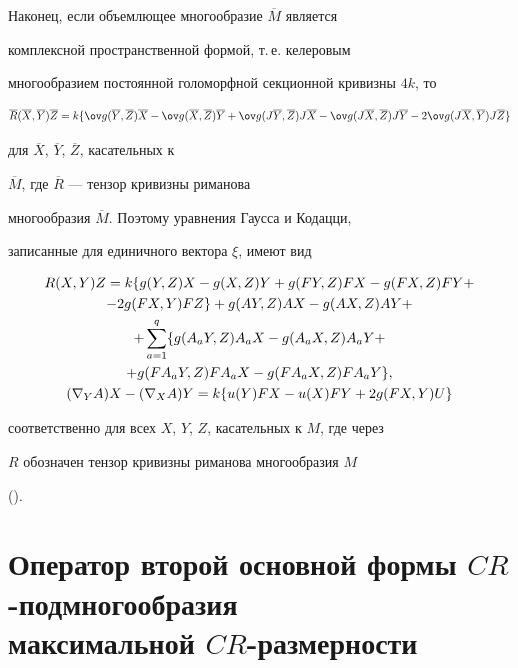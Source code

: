 Наконец, если объемлющее многообразие $\overline M$ является


комплексной пространственной формой, т.\,е. келеровым


многообразием постоянной голоморфной секционной кривизны $4k$, то


$$


\overline R(\overline X,\overline Y)\overline Z=


k\{\ov g(\overline Y,\overline Z)\overline X-


\ov g(\overline X,\overline Z)\overline Y+


\ov g(J\overline Y,\overline Z)J\overline X-


\ov g(J\overline X,\overline Z)J\overline Y


-2\ov g(J\overline X,\overline Y)J\overline Z\}


$$


для  $\overline X$, $\overline Y$, $\overline Z$, касательных к


$\overline M$, где $\overline R$ --- тензор кривизны риманова


многообразия $\overline M$. Поэтому уравнения Гаусса и Кодацци,


записанные для единичного вектора $\xi$, имеют вид


\begin{gather}


R(X,Y)Z=k\{g(Y,Z)X-g(X,Z)Y+g(FY,Z)FX-g(FX,Z)FY+ \\


-2g(FX,Y)FZ\}+g(AY,Z)AX-g(AX,Z)AY+\notag \\


+\sum_{a=1}^q\{g(A_aY,Z)A_aX-g(A_aX,Z)A_aY+\notag \\


+g(FA_aY,Z)FA_aX-g(FA_aX,Z)FA_aY\},\notag\\


(\nabla_YA)X-(\nabla_XA)Y=k\{u(Y)FX-u(X)FY+


2g(FX,Y)U\}\notag


\end{gather}


соответственно для всех $X$, $Y$, $Z$, касательных к $M$, где через


$R$ обозначен  тензор кривизны риманова многообразия $M$


(\cite{KobNom}).








\section{Оператор второй основной формы $CR$-подмногообразия\protect\\


максимальной $CR$-размерности}








